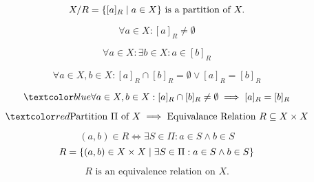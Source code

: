 \begin{frame}{}
  \begin{theorem}
    \[
      X/R = \{[a]_{R} \mid a \in X\} \text{ is a partition of } X.
    \]
  \end{theorem}

  \pause
  \[
    \forall a \in X: [a]_{R} \neq \emptyset
  \]

  \pause
  \[
    \forall a \in X: \exists b \in X: a \in [b]_{R}
  \]

  \pause
  \begin{theorem}
    \[
      \forall a \in X, b \in X: [a]_{R} \cap [b]_{R} = \emptyset \lor [a]_{R} = [b]_{R}
    \]
  \end{theorem}

  \pause
  \[
    \blue{\forall a \in X, b \in X: [a]_{R} \cap [b]_{R} \neq \emptyset \implies [a]_{R} = [b]_{R}}
  \]
\end{frame}


\begin{frame}{}
  \[
    \red{\text{Partition } \Pi \text{ of } X \implies \text{Equivalance Relation } R \subseteq X \times X}
  \]

  \pause
  \begin{definition}
    \[
      (a, b) \in R \iff \exists S \in \Pi: a \in S \land b \in S
    \]
    \[
      R = \{(a, b) \in X \times X \mid \exists S \in \Pi: a \in S \land b \in S\}
    \]
  \end{definition}

  \pause
  \begin{theorem}
    \[
      R \text{ is an equivalence relation on } X.
    \]
  \end{theorem}

  \pause
\end{frame}

